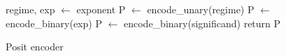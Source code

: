 \begin{algorithm}[H]
\SetAlgoLined
{}
regime, exp $\leftarrow$ exponent\;
P $\leftarrow$ encode\_unary(regime)\;
P $\leftarrow$ encode\_binary(exp)\;
P $\leftarrow$ encode\_binary(significand)\;
return P\;
\caption{Posit encoder}
\label{alg:posit_enc}
\end{algorithm}






